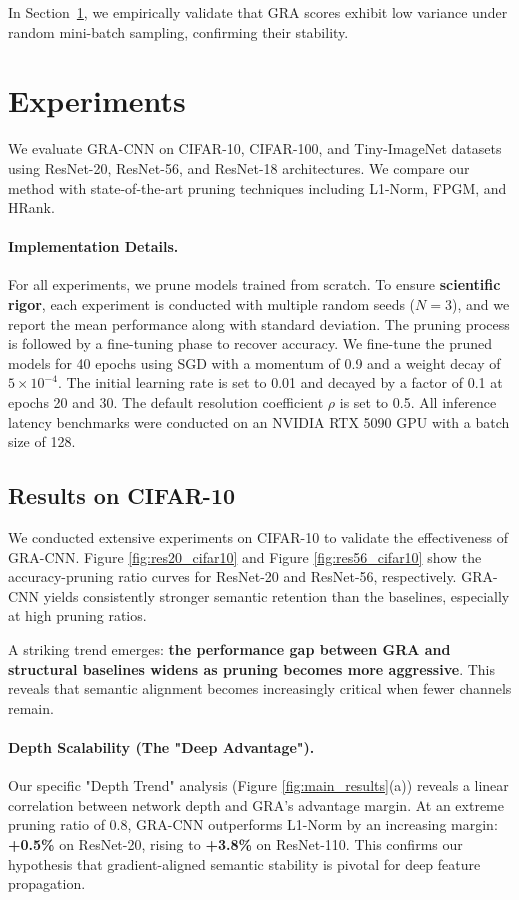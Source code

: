 \documentclass[sn-mathphys,Numbered]{sn-jnl}
\begin{document}
In Section~\ref{sec:experiments}, we empirically validate that GRA scores exhibit low variance under random mini-batch sampling, confirming their stability.

\section{Experiments}
\label{sec:experiments}
We evaluate GRA-CNN on CIFAR-10, CIFAR-100, and Tiny-ImageNet datasets using ResNet-20, ResNet-56, and ResNet-18 architectures. We compare our method with state-of-the-art pruning techniques including L1-Norm, FPGM, and HRank.
\paragraph{Implementation Details.}
For all experiments, we prune models trained from scratch. To ensure \textbf{scientific rigor}, each experiment is conducted with multiple random seeds ($N=3$), and we report the mean performance along with standard deviation. The pruning process is followed by a fine-tuning phase to recover accuracy. We fine-tune the pruned models for 40 epochs using SGD with a momentum of 0.9 and a weight decay of $5 \times 10^{-4}$. The initial learning rate is set to 0.01 and decayed by a factor of 0.1 at epochs 20 and 30. The default resolution coefficient $\rho$ is set to 0.5. All inference latency benchmarks were conducted on an NVIDIA RTX 5090 GPU with a batch size of 128.


\subsection{Results on CIFAR-10}
We conducted extensive experiments on CIFAR-10 to validate the effectiveness of GRA-CNN. Figure \ref{fig:res20_cifar10} and Figure \ref{fig:res56_cifar10} show the accuracy-pruning ratio curves for ResNet-20 and ResNet-56, respectively. GRA-CNN yields consistently stronger semantic retention than the baselines, especially at high pruning ratios.

A striking trend emerges:
\textbf{the performance gap between GRA and structural baselines widens as pruning becomes more aggressive}.
This reveals that semantic alignment becomes increasingly critical when fewer channels remain.

\paragraph{Depth Scalability (The "Deep Advantage").}
Our specific "Depth Trend" analysis (Figure \ref{fig:main_results}(a)) reveals a linear correlation between network depth and GRA's advantage margin. At an extreme pruning ratio of 0.8, GRA-CNN outperforms L1-Norm by an increasing margin: \textbf{+0.5\%} on ResNet-20, rising to \textbf{+3.8\%} on ResNet-110. This confirms our hypothesis that gradient-aligned semantic stability is pivotal for deep feature propagation.
\end{document}
